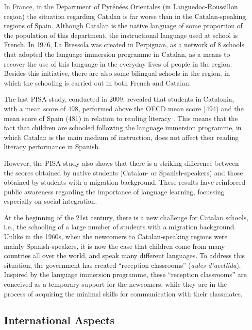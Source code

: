 \begin{multicols}{2}
In France, in the Department of Pyrénées Orientales (in Languedoc-Roussillon region) the situation regarding Catalan is far worse than in the Catalan-speaking regions of Spain. Although Catalan is the native language of some proportion of the population of this department, the instructional language used at school is French. In 1976, La Bressola \cite{CAT-Nota6} was created in Perpignan, as a network of 8 schools that adopted the language immersion programme in Catalan, as a means to recover the use of this language in the everyday lives of people in the region. Besides this initiative, there are also some bilingual schools in the region, in which the schooling is carried out in both French and Catalan.

The last PISA study, conducted in 2009, revealed that students in Catalonia, with a mean score of 498, performed above the OECD mean score (494) and the mean score of Spain (481) in relation to reading literacy \cite{CAT-Nota7}. This means that the fact that children are schooled following the language immersion programme, in which Catalan is the main medium of instruction, does not affect their reading literacy performance in Spanish.

However, the PISA study also shows that there is a striking difference between the scores obtained by native students (Catalan- or Spanish-speakers) and those obtained by students with a migration background. These results have reinforced public awareness regarding the importance of language learning, focussing especially on social integration.

At the beginning of the 21st century, there is a new challenge for Catalan schools, i.e., the schooling of a large number of students with a migration background. Unlike in the 1960s, when the newcomers to Catalan-speaking regions were mainly Spanish-speakers, it is now the case that children come from many countries all over the world, and speak many different languages. To address this situation, the government has created “reception classrooms” (\textit{aules d’acollida}). Inspired by the language immersion programme, these “reception classrooms” are conceived as a temporary support for the newcomers, while they are in the process of acquiring the minimal skills for communication with their classmates.

\subsection{International Aspects}


\end{multicols}
